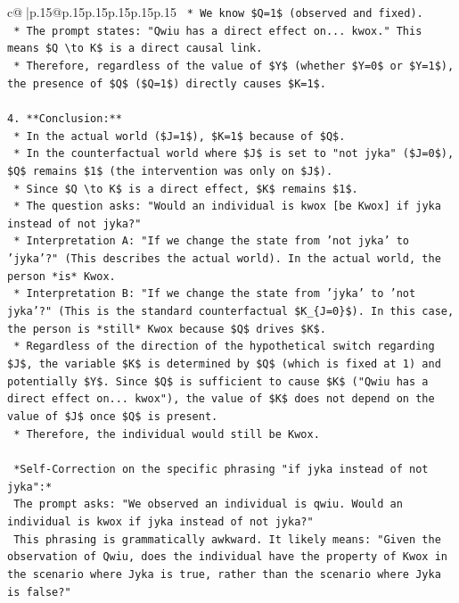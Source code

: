 \documentclass{article}
\begin{document}
{\begin{supertabular}{c@{$\;$}|p{.15\linewidth}@{}p{.15\linewidth}p{.15\linewidth}p{.15\linewidth}p{.15\linewidth}p{.15\linewidth}}
{{{\texttt{        *   We know \$Q=1\$ (observed and fixed).} \\
\texttt{        *   The prompt states: "Qwiu has a direct effect on... kwox." This means \$Q \textbackslash{}to K\$ is a direct causal link.} \\
\texttt{        *   Therefore, regardless of the value of \$Y\$ (whether \$Y=0\$ or \$Y=1\$), the presence of \$Q\$ (\$Q=1\$) directly causes \$K=1\$.} \\
\\ 
\texttt{4.  **Conclusion:**} \\
\texttt{    *   In the actual world (\$J=1\$), \$K=1\$ because of \$Q\$.} \\
\texttt{    *   In the counterfactual world where \$J\$ is set to "not jyka" (\$J=0\$), \$Q\$ remains \$1\$ (the intervention was only on \$J\$).} \\
\texttt{    *   Since \$Q \textbackslash{}to K\$ is a direct effect, \$K\$ remains \$1\$.} \\
\texttt{    *   The question asks: "Would an individual is kwox {[}be Kwox{]} if jyka instead of not jyka?"} \\
\texttt{        *   Interpretation A: "If we change the state from 'not jyka' to 'jyka'?" (This describes the actual world). In the actual world, the person *is* Kwox.} \\
\texttt{        *   Interpretation B: "If we change the state from 'jyka' to 'not jyka'?" (This is the standard counterfactual \$K\_\{J=0\}\$). In this case, the person is *still* Kwox because \$Q\$ drives \$K\$.} \\
\texttt{    *   Regardless of the direction of the hypothetical switch regarding \$J\$, the variable \$K\$ is determined by \$Q\$ (which is fixed at 1) and potentially \$Y\$. Since \$Q\$ is sufficient to cause \$K\$ ("Qwiu has a direct effect on... kwox"), the value of \$K\$ does not depend on the value of \$J\$ once \$Q\$ is present.} \\
\texttt{    *   Therefore, the individual would still be Kwox.} \\
\\ 
\texttt{    *Self{-}Correction on the specific phrasing "if jyka instead of not jyka":*} \\
\texttt{    The prompt asks: "We observed an individual is qwiu. Would an individual is kwox if jyka instead of not jyka?"} \\
\texttt{    This phrasing is grammatically awkward. It likely means: "Given the observation of Qwiu, does the individual have the property of Kwox in the scenario where Jyka is true, rather than the scenario where Jyka is false?"} \\
}}}
\end{supertabular}}
\end{document}
